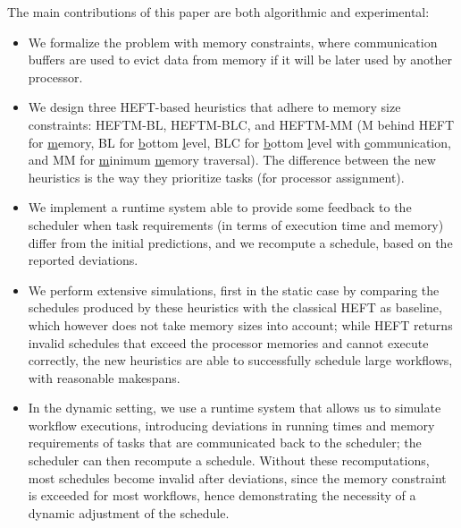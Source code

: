 \documentclass[conference]{IEEEtran}
\newcommand{\algo}[1]{\textsc{#1}}
\newcommand{\heftmm}{\algo{HEFTM-MM}\xspace}
\newcommand{\heftbl}{\algo{HEFTM-BL}\xspace}
\newcommand{\heftblc}{\algo{HEFTM-BLC}\xspace}
\newcommand{\hmey}[1]{{\color{red}[HM: #1]}}
\begin{document}
    The main contributions of this paper are both algorithmic and experimental:
    \begin{itemize}
\item We formalize the problem with memory constraints, where communication buffers
are used to evict data from memory if it will be later used by another processor. 
\item We design three HEFT-based heuristics
    that adhere to memory size constraints: \heftbl, \heftblc, and \heftmm
    (M behind HEFT for \underline{m}emory, BL for \underline{b}ottom \underline{l}evel,
    BLC for \underline{b}ottom \underline{l}evel with \underline{c}ommunication, 
    and MM for \underline{m}inimum \underline{m}emory traversal).
    The difference between the new heuristics is the way they prioritize tasks (for processor assignment).
    
    \item We implement a runtime system able to provide some feedback to the scheduler
    when task requirements (in terms of execution time and memory) differ from the initial predictions, 
    and we recompute a schedule, based on the reported deviations. 
    
    \item We perform extensive simulations, first in the static case by comparing the schedules produced 
    by these heuristics with the classical HEFT as baseline, which however does not take memory sizes into account; 
    while HEFT returns invalid schedules that exceed the processor memories and cannot execute correctly,
    the new heuristics are able to successfully schedule large workflows, with reasonable makespans.
    
    \item In the dynamic setting, we use a runtime system that allows us to simulate workflow executions,
    introducing deviations in running times and memory requirements of tasks that are communicated
    back to the scheduler; the scheduler can then recompute a schedule. Without these recomputations,
    most schedules become invalid after deviations, since the memory constraint is exceeded 
    for most workflows, hence demonstrating the necessity of a dynamic adjustment of the schedule. 

    
    \end{itemize}
\end{document}
